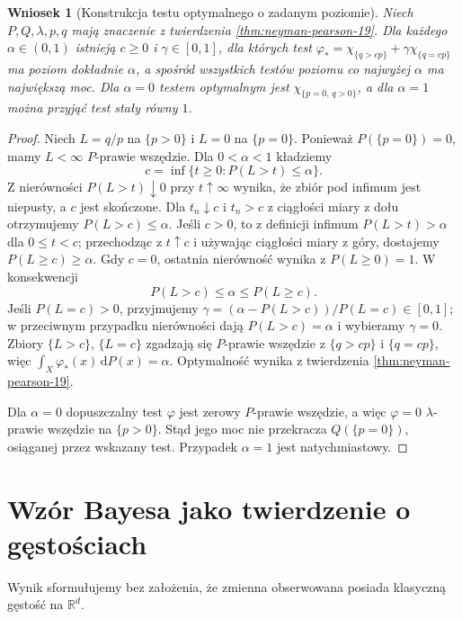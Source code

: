 \documentclass[11pt,a4paper,oneside]{book}
\numberwithin{equation}{chapter}
\theoremstyle{plain}
\newtheorem{wniosek}[twierdzenie]{Wniosek}
\theoremstyle{definition}
\theoremstyle{remark}
\begin{document}
\begin{wniosek}[Konstrukcja testu optymalnego o zadanym poziomie]
\label{cor:NP-exact-alpha-19}
Niech $P,Q,\lambda,p,q$ mają znaczenie z twierdzenia
\ref{thm:neyman-pearson-19}. Dla każdego
$\alpha\in(0,1)$ istnieją $c\ge0$ i
$\gamma\in[0,1]$, dla których test
$\varphi_*=\chi_{\{q>cp\}}+\gamma\chi_{\{q=cp\}}$
ma poziom dokładnie $\alpha$, a spośród wszystkich
testów poziomu co najwyżej $\alpha$ ma największą moc.
Dla $\alpha=0$ testem optymalnym jest
$\chi_{\{p=0,\,q>0\}}$, a dla $\alpha=1$
można przyjąć test stały równy $1$.
\end{wniosek}
\begin{proof}
Niech $L=q/p$ na $\{p>0\}$ i $L=0$ na $\{p=0\}$.
Ponieważ $P(\{p=0\})=0$, mamy $L<\infty$
$P$-prawie wszędzie. Dla $0<\alpha<1$ kładziemy
\[
 c=\inf\{t\ge0:P(L>t)\le\alpha\}.
\]
Z nierówności $P(L>t)\downarrow0$ przy $t\uparrow\infty$
wynika, że zbiór pod infimum jest niepusty, a $c$ jest
skończone. Dla $t_n\downarrow c$ i $t_n>c$ z ciągłości
miary z dołu otrzymujemy $P(L>c)\le\alpha$.
Jeśli $c>0$, to z definicji infimum
$P(L>t)>\alpha$ dla $0\le t<c$;
przechodząc z $t\uparrow c$ i używając ciągłości miary
z góry, dostajemy $P(L\ge c)\ge\alpha$.
Gdy $c=0$, ostatnia nierówność wynika z
$P(L\ge0)=1$.
W konsekwencji
\[
 P(L>c)\le\alpha\le P(L\ge c).
\]
Jeśli $P(L=c)>0$, przyjmujemy
$\gamma=(\alpha-P(L>c))/P(L=c)\in[0,1]$;
w przeciwnym przypadku nierówności dają
$P(L>c)=\alpha$ i wybieramy $\gamma=0$.
Zbiory $\{L>c\}$, $\{L=c\}$ zgadzają się
$P$-prawie wszędzie z $\{q>cp\}$ i $\{q=cp\}$,
więc $\int_X\varphi_*(x)\,\mathrm dP(x)=\alpha$.
Optymalność wynika z twierdzenia
\ref{thm:neyman-pearson-19}.

Dla $\alpha=0$ dopuszczalny test $\varphi$ jest zerowy
$P$-prawie wszędzie, a więc $\varphi=0$
$\lambda$-prawie wszędzie na $\{p>0\}$.
Stąd jego moc nie przekracza
$Q(\{p=0\})$, osiąganej przez wskazany test.
Przypadek $\alpha=1$ jest natychmiastowy.
\end{proof}

\section{Wzór Bayesa jako twierdzenie o gęstościach}
Wynik sformułujemy bez założenia, że zmienna obserwowana
posiada klasyczną gęstość na $\mathbb R^d$.
\end{document}
